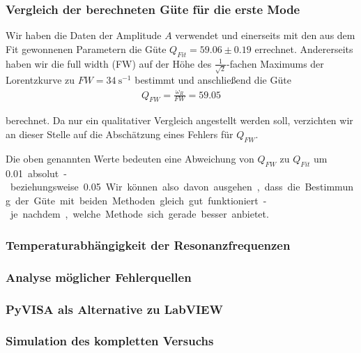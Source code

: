 \subsubsection*{Vergleich der berechneten Güte für die erste Mode}

Wir haben die Daten der Amplitude $A$ verwendet und einerseits mit den aus dem Fit gewonnenen Parametern die Güte $Q_{Fit} = 59.06 \pm 0.19$ errechnet.
Andererseits haben wir die full width (FW) auf der Höhe des $\frac{1}{\sqrt{2}}$-fachen Maximums der Lorentzkurve zu $FW = \SI{34}{\second^{-1}}$ bestimmt und anschließend die Güte
\begin{align}
    Q_{FW} = \frac{\omega_R}{FW} = 59.05
\end{align}

berechnet. Da nur ein qualitativer Vergleich angestellt werden soll, verzichten wir an dieser Stelle auf die Abschätzung eines Fehlers für $Q_{FW}$.

Die oben genannten Werte bedeuten eine Abweichung von $Q_{FW}$ zu $Q_{Fit}$ um \SI{0.01} absolut - beziehungsweise \SI{0.05}{\sigma}.
Wir können also davon ausgehen, dass die Bestimmung der Güte mit beiden Methoden gleich gut funktioniert - je nachdem, welche Methode sich gerade besser anbietet.

\subsubsection*{Temperaturabhängigkeit der Resonanzfrequenzen}



\subsubsection*{Analyse möglicher Fehlerquellen}


\subsubsection*{PyVISA als Alternative zu LabVIEW}


\subsubsection*{Simulation des kompletten Versuchs}


